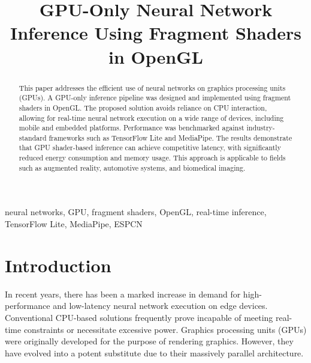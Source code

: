 \documentclass[conference]{IEEEtran}
\begin{document}
\title{GPU-Only Neural Network Inference Using Fragment Shaders in OpenGL}

\author{
\and
{}
}

\maketitle

\begin{abstract}
This paper addresses the efficient use of neural networks on graphics processing units (GPUs). A GPU-only inference pipeline was designed and implemented using fragment shaders in OpenGL. The proposed solution avoids reliance on CPU interaction, allowing for real-time neural network execution on a wide range of devices, including mobile and embedded platforms. Performance was benchmarked against industry-standard frameworks such as TensorFlow Lite and MediaPipe. The results demonstrate that GPU shader-based inference can achieve competitive latency, with significantly reduced energy consumption and memory usage. This approach is applicable to fields such as augmented reality, automotive systems, and biomedical imaging.
\end{abstract}

\begin{IEEEkeywords}
neural networks, GPU, fragment shaders, OpenGL, real-time inference, TensorFlow Lite, MediaPipe, ESPCN
\end{IEEEkeywords}

\section{Introduction}
In recent years, there has been a marked increase in demand for high-performance and low-latency neural network execution on edge devices. Conventional CPU-based solutions frequently prove incapable of meeting real-time constraints or necessitate excessive power. Graphics processing units (GPUs) were originally developed for the purpose of rendering graphics. However, they have evolved into a potent substitute due to their massively parallel architecture.
\end{document}
